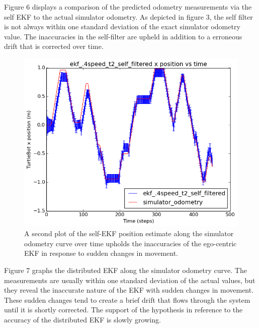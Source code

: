 \documentclass[conference]{IEEEtran} \usepackage[T1]{fontenc} \usepackage[backend=biber, style=ieee]{biblatex}
\begin{document}
Figure 6 displays a comparison of the predicted odometry measurements via the self EKF to the actual simulator 
odometry. As depicted in figure 3, the self filter is not always within one standard deviation of the exact simulator 
odometry value. The inaccuracies in the self-filter are upheld in addition to a erroneous drift that is corrected over 
time.

\begin{figure}[!ht]
\label{pic6} 
\centering 
\includegraphics[scale=.45]{ekf_4speed_t2_self_filtered_pos_err_graph}
\caption {A second plot of the self-EKF position estimate along the simulator odometry curve over time 
upholds the inaccuracies of the ego-centric EKF in response to sudden changes in movement.}
\end{figure}

Figure 7 graphs the distributed EKF along the simulator odometry curve. The measurements are usually within one standard 
deviation of the actual values, but they reveal the inaccurate nature of the EKF with sudden changes in movement. These 
sudden changes tend to create a brief drift that flows through the system until it is shortly corrected. The support of 
the hypothesis in reference to the accuracy of the distributed EKF is slowly growing.
\end{document}
